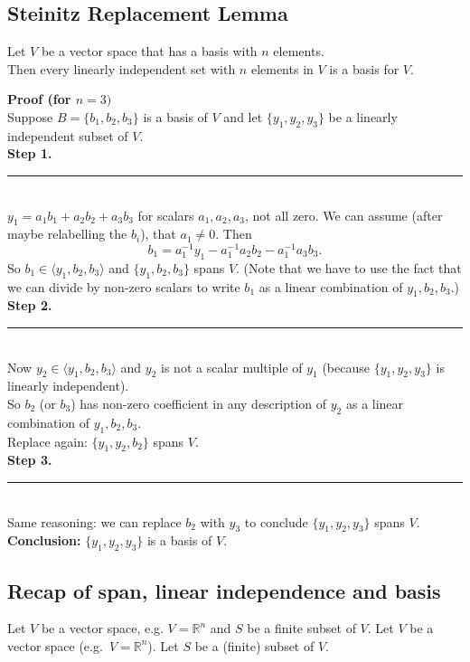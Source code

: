 \documentclass[a4paper, 9pt]{extarticle}
\begin{document}
\subsection{Steinitz Replacement Lemma}
\begin{lemmabox}{}{}
  Let $V$ be a vector space that has a basis with $n$ elements. \\[2ex]
  Then every linearly independent set with $n$ elements in $V$ is a basis for $V$.
\end{lemmabox}
\noindent \textbf{Proof (for $n = 3)$} \\
Suppose $B = \{b_1, b_2, b_3\}$ is a basis of $V$ and let $\{y_1, y_2, y_3\}$ be a linearly independent subset of $V$. \\[2ex]
\textbf{Step 1.} \rule[.25\baselineskip]{\textwidth}{0.5px}\\
$y_1 = a_1 b_1 + a_2 b_2 + a_3 b_3$ for scalars $a_1, a_2, a_3$, not all zero.
We can assume (after maybe relabelling the $b_i$), that $a_1 \ne 0$.
Then
$$
  b_1 = a_1^{-1} y_1 - a_1^{-1} a_2 b_2 - a_1^{-1} a_3 b_3.
$$
So $b_1 \in \langle y_1, b_2, b_3 \rangle$ and $\{y_1, b_2, b_3\}$ spans $V$.
(Note that we have to use the fact that we can divide by non-zero scalars to write $b_1$ as a linear combination of $y_1, b_2, b_3$.) \\[2ex]
\textbf{Step 2.} \rule[.25\baselineskip]{\textwidth}{0.5px}\\
Now $y_2 \in \langle y_1, b_2, b_3 \rangle$ and $y_2$ is not a scalar multiple of $y_1$ (because $\{y_1, y_2, y_3\}$ is linearly independent). \\
So $b_2$ (or $b_3$) has non-zero coefficient in any description of $y_2$ as a linear combination of $y_1, b_2, b_3$. \\
Replace again: $\{y_1, y_2, b_2\}$ spans $V$. \\[2ex]
\textbf{Step 3.} \rule[.25\baselineskip]{\textwidth}{0.5px}\\
Same reasoning: we can replace $b_2$ with $y_3$ to conclude $\{y_1, y_2, y_3\}$ spans $V$. \\[2ex]
\textbf{Conclusion:} $\{y_1, y_2, y_3\}$ is a basis of $V$.
\subsection{Recap of span, linear independence and basis}
Let $V$ be a vector space, e.g. $V = \mathbb{R}^n$ and $S$ be a finite subset of $V$.
Let $V$ be a vector space (e.g.\ $V = \mathbb{R}^n$). Let $S$ be a (finite) subset of $V$.
\end{document}
